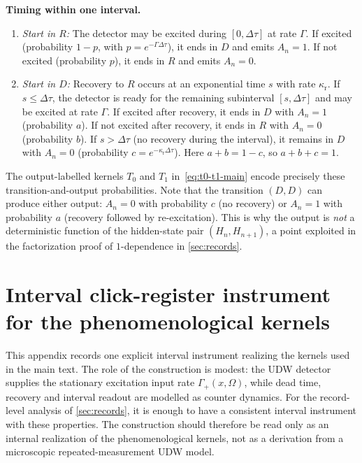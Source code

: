 \noindent\textbf{Timing within one interval.}
\begin{enumerate}[label=(\alph*),itemsep=0.15em]
\item \emph{Start in $R$:} The detector may be excited during $[0,\Delta\tau]$ at rate $\Gamma$. If excited (probability $1-p$, with $p=e^{-\Gamma\Delta\tau}$), it ends in $D$ and emits $A_n=1$. If not excited (probability $p$), it ends in $R$ and emits $A_n=0$.
\item \emph{Start in $D$:} Recovery to $R$ occurs at an exponential time $s$ with rate $\kappa_{\mathrm r}$. If $s\le\Delta\tau$, the detector is ready for the remaining subinterval $[s,\Delta\tau]$ and may be excited at rate $\Gamma$. If excited after recovery, it ends in $D$ with $A_n=1$ (probability $a$). If not excited after recovery, it ends in $R$ with $A_n=0$ (probability $b$). If $s>\Delta\tau$ (no recovery during the interval), it remains in $D$ with $A_n=0$ (probability $c=e^{-\kappa_{\mathrm r}\Delta\tau}$). Here $a+b=1-c$, so $a+b+c=1$.
\end{enumerate}

The output-labelled kernels $T_0$ and $T_1$ in~\eqref{eq:t0-t1-main} encode precisely these transition-and-output probabilities. Note that the transition $(D,D)$ can produce either output: $A_n=0$ with probability $c$ (no recovery) or $A_n=1$ with probability $a$ (recovery followed by re-excitation). This is why the output is \emph{not} a deterministic function of the hidden-state pair $(H_n,H_{n+1})$, a point exploited in the factorization proof of $1$-dependence in \cref{sec:records}.

\section{Interval click-register instrument for the phenomenological kernels}\label{app:gkls}

This appendix records one explicit interval instrument realizing the kernels used in the main text. The role of the construction is modest: the UDW detector supplies the stationary excitation input rate $\Gamma_+(x,\Omega)$, while dead time, recovery and interval readout are modelled as counter dynamics. For the record-level analysis of \cref{sec:records}, it is enough to have a consistent interval instrument with these properties. The construction should therefore be read only as an internal realization of the phenomenological kernels, not as a derivation from a microscopic repeated-measurement UDW model.

